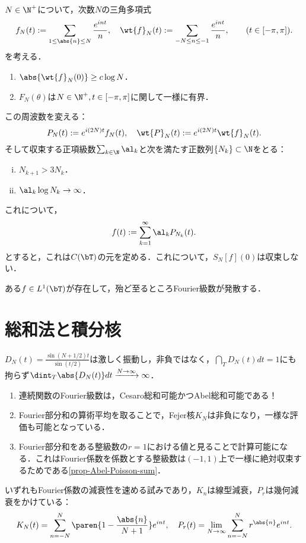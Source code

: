 \documentclass[uplatex,dvipdfmx]{jsreport}
\begin{document}
\begin{theorem}
    $N\in\N^+$について，次数$N$の三角多項式
    \[f_N(t):=\sum_{1\le\abs{n}\le N}\frac{e^{int}}{n},\quad \wt{f}_N(t):=\sum_{-N\le n\le -1}\frac{e^{int}}{n},\qquad(t\in[-\pi,\pi]).\]
    を考える．
    \begin{enumerate}
        \item $\abs{\wt{f}_N(0)}\ge c\log N$．
        \item $F_N(\theta)$は$N\in\N^+,t\in[-\pi,\pi]$に関して一様に有界．
    \end{enumerate}
    この周波数を変える：
    \[P_N(t):=e^{i(2N)t}f_N(t),\quad \wt{P}_N(t):=e^{i(2N)t}\wt{f}_N(t).\]
    そして収束する正項級数$\sum_{k\in\N}\al_k$と次を満たす正数列$\{N_k\}\subset\N$をとる：
    \begin{enumerate}[(i)]
        \item $N_{k+1}>3N_k$．
        \item $\al_k\log N_k\to\infty$．
    \end{enumerate}
    これについて，
    \[f(t):=\sum_{k=1}^\infty\al_kP_{N_k}(t).\]
    とすると，これは$C(\bT)$の元を定める．これについて，$S_N[f](0)$は収束しない．
\end{theorem}

\begin{theorem}[Kolmogorov]
    ある$f\in L^1(\bT)$が存在して，殆ど至るところFourier級数が発散する．
\end{theorem}

\section{総和法と積分核}

\begin{tcolorbox}[colframe=ForestGreen, colback=ForestGreen!10!white,breakable,colbacktitle=ForestGreen!40!white,coltitle=black,fonttitle=\bfseries\sffamily,
title=Dirichlet核を飼い慣らす試み]
    $D_N(t)=\frac{\sin(N+1/2)t}{\sin(t/2)}$は激しく振動し，非負ではなく，$\dint_TD_N(t)dt=1$にも拘らず$\dint_T\abs{D_N(t)}dt\xrightarrow{N\to\infty}\infty$．
    \begin{enumerate}
        \item 連続関数のFourier級数は，Cesaro総和可能かつAbel総和可能である！
        \item Fourier部分和の算術平均を取ることで，Fejer核$K_N$は非負になり，一様な評価も可能となっている．
        \item Fourier部分和をある整級数の$r=1$における値と見ることで計算可能になる．これはFourier係数を係数とする整級数は$(-1,1)$上で一様に絶対収束するためである\ref{prop-Abel-Poisson-sum}．
    \end{enumerate}
    いずれもFourier係数の減衰性を速める試みであり，$K_n$は線型減衰，$P_r$は幾何減衰をかけている：
    \[K_N(t)=\sum_{n=-N}^N\paren{1-\frac{\abs{n}}{N+1}}e^{int},\quad P_r(t)=\lim_{N\to\infty}\sum_{n=-N}^Nr^{\abs{n}}e^{int}.\]
\end{tcolorbox}
\end{document}
